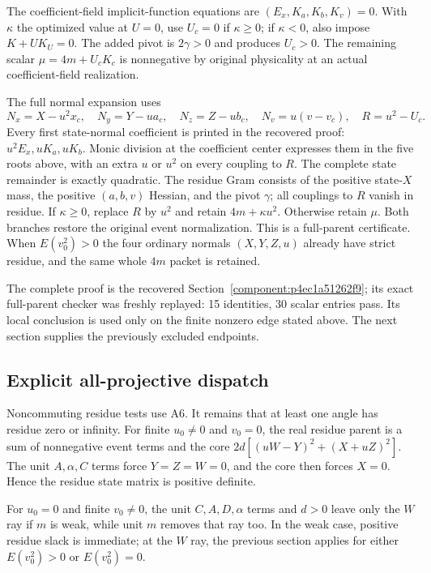 The coefficient-field implicit-function equations are
$(E_x,K_a,K_b,K_v)=0$. With $\kappa$ the optimized value at $U=0$,
use $U_c=0$ if $\kappa\geq0$; if $\kappa<0$, also impose
$K+UK_U=0$. The added pivot is $2\gamma>0$ and produces $U_c>0$.
The remaining scalar $\mu=4m+U_cK_c$ is nonnegative by original
physicality at an actual coefficient-field realization.

The full normal expansion uses
\[
 N_x=X-u^2x_c,\quad N_y=Y-ua_c,\quad N_z=Z-ub_c,
 \quad N_v=u(v-v_c),\quad R=u^2-U_c.
\]
Every first state-normal coefficient is printed in the recovered proof:
$u^2E_x,uK_a,uK_b$. Monic division at the coefficient center expresses
them in the five roots above, with an extra $u$ or $u^2$ on every
coupling to $R$. The complete state remainder is exactly quadratic.
The residue Gram consists of the positive state-$X$ mass, the positive
$(a,b,v)$ Hessian, and the pivot $\gamma$; all couplings to $R$ vanish
in residue. If $\kappa\geq0$, replace $R$ by $u^2$ and retain
$4m+\kappa u^2$. Otherwise retain $\mu$. Both branches restore the
original event normalization. This is a full-parent certificate.
When $E(v_0^2)>0$ the four ordinary normals $(X,Y,Z,u)$ already
have strict residue, and the same whole $4m$ packet is retained.

The complete proof is the recovered
Section~\ref{component:p4ec1a51262f9}; its exact full-parent
checker was freshly replayed: 15 identities, 30 scalar entries pass.
Its local conclusion is used only on the finite nonzero edge stated
above. The next section supplies the previously excluded endpoints.

\subsection*{Explicit all-projective dispatch}

Noncommuting residue tests use A6. It remains that at least one angle
has residue zero or infinity. For finite $u_0\ne0$ and $v_0=0$,
the real residue parent is a sum of nonnegative event terms and the
core $2d[(uW-Y)^2+(X+uZ)^2]$. The unit $A,\alpha,C$ terms
force $Y=Z=W=0$, and the core then forces $X=0$.
Hence the residue state matrix is positive definite.

For $u_0=0$ and finite $v_0\ne0$, the unit $C,A,D,\alpha$ terms
and $d>0$ leave only the $W$ ray if $m$ is weak, while unit $m$
removes that ray too. In the weak case, positive residue slack is
immediate; at the $W$ ray, the previous section applies for either
$E(v_0^2)>0$ or $E(v_0^2)=0$.

